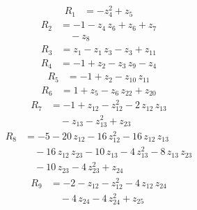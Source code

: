 \begin{equation*}\begin{aligned}
R_{1}&=-z_{4}^{2} +z_{5}
\end{aligned}\end{equation*}
\begin{equation*}\begin{aligned}
R_{2}&=-1 -z_{4}\,z_{6} +z_{6} +z_{7} \\
&\quad -z_{8}
\end{aligned}\end{equation*}
\begin{equation*}\begin{aligned}
R_{3}&=z_{1} -z_{1}\,z_{3} -z_{3} +z_{11}
\end{aligned}\end{equation*}
\begin{equation*}\begin{aligned}
R_{4}&=-1 +z_{2} -z_{3}\,z_{9} -z_{4}
\end{aligned}\end{equation*}
\begin{equation*}\begin{aligned}
R_{5}&=-1 +z_{2} -z_{10}\,z_{11}
\end{aligned}\end{equation*}
\begin{equation*}\begin{aligned}
R_{6}&=1 +z_{5} -z_{6}\,z_{22} +z_{20}
\end{aligned}\end{equation*}
\begin{equation*}\begin{aligned}
R_{7}&=-1 +z_{12} -z_{12}^{2} -2\,z_{12}\,z_{13} \\
&\quad -z_{13} -z_{13}^{2} +z_{23}
\end{aligned}\end{equation*}
\begin{equation*}\begin{aligned}
R_{8}&=-5 -20\,z_{12} -16\,z_{12}^{2} -16\,z_{12}\,z_{13} \\
&\quad -16\,z_{12}\,z_{23} -10\,z_{13} -4\,z_{13}^{2} -8\,z_{13}\,z_{23} \\
&\quad -10\,z_{23} -4\,z_{23}^{2} +z_{24}
\end{aligned}\end{equation*}
\begin{equation*}\begin{aligned}
R_{9}&=-2 -z_{12} -z_{12}^{2} -4\,z_{12}\,z_{24} \\
&\quad -4\,z_{24} -4\,z_{24}^{2} +z_{25}
\end{aligned}\end{equation*}
